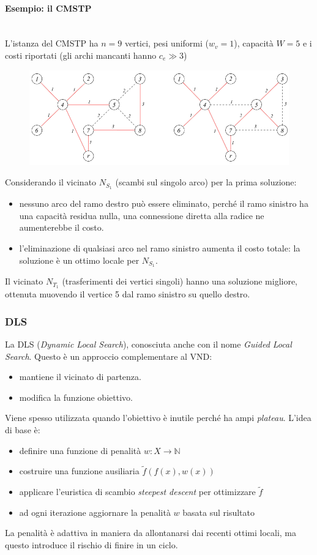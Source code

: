 \documentclass{article}
\begin{document}
\paragraph{Esempio: il CMSTP}\mbox{}\\
L'istanza del CMSTP ha $n=9$ vertici, pesi uniformi ($w_v=1$), capacità $W=5$ e i costi
riportati (gli archi mancanti hanno $c_e\gg 3$)
\begin{figure}[H]
    \centering
    \includegraphics[scale=0.5]{images/cmstpex1.png}
\end{figure}
Considerando il vicinato $N_{S_1}$ (scambi sul singolo arco) per la prima soluzione:
\begin{itemize}
    \item nessuno arco del ramo destro può essere eliminato, perché il ramo sinistro
    ha una capacità residua nulla, una connessione diretta alla radice ne aumenterebbe il costo.
    \item l'eliminazione di qualsiasi arco nel ramo sinistro aumenta il costo totale: la
    soluzione è un ottimo locale per $N_{S_1}$.
\end{itemize}
Il vicinato $N_{T_1}$ (trasferimenti dei vertici singoli) hanno una soluzione migliore, ottenuta
muovendo il vertice 5 dal ramo sinistro su quello destro.

\subsubsection{DLS}
La DLS (\textit{Dynamic Local Search}), conosciuta anche con il nome \textit{Guided Local Search}.
Questo è un approccio complementare al VND:
\begin{itemize}
    \item mantiene il vicinato di partenza.
    \item modifica la funzione obiettivo.
\end{itemize}
Viene spesso utilizzata quando l'obiettivo è inutile perché ha ampi \textit{plateau}. L'idea di
base è:
\begin{itemize}
    \item definire una funzione di penalità $w:X\rightarrow\mathbb{N}$
    \item costruire una funzione ausiliaria $\tilde{f}(f(x),w(x))$
    \item applicare l'euristica di scambio \textit{steepest descent} per ottimizzare $\tilde{f}$
    \item ad ogni iterazione aggiornare la penalità $w$ basata sul risultato
\end{itemize}
La penalità è adattiva in maniera da allontanarsi dai recenti ottimi locali, ma questo introduce
il rischio di finire in un ciclo.
\end{document}

